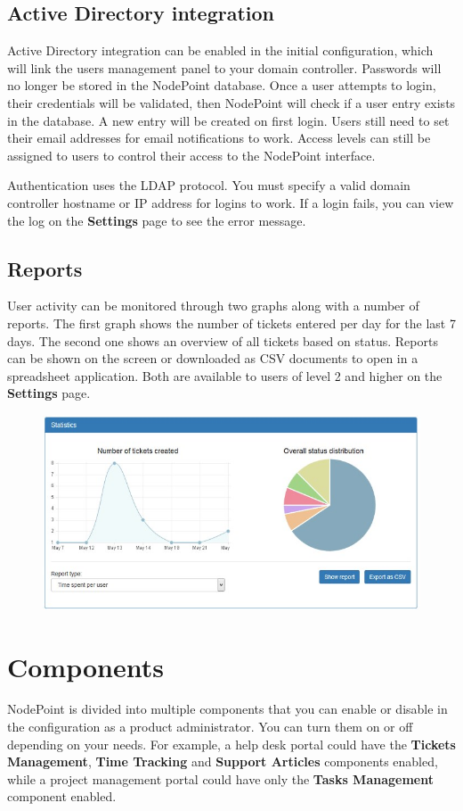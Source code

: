 \documentclass[11pt]{article}
\begin{document}
\subsection{Active Directory integration}
Active Directory integration can be enabled in the initial configuration, which will link the users management panel to your domain controller. Passwords will no longer be stored in the NodePoint database. Once a user attempts to login, their credentials will be validated, then NodePoint will check if a user entry exists in the database. A new entry will be created on first login. Users still need to set their email addresses for email notifications to work. Access levels can still be assigned to users to control their access to the NodePoint interface.

Authentication uses the LDAP protocol. You must specify a valid domain controller hostname or IP address for logins to work. If a login fails, you can view the log on the \textbf{Settings} page to see the error message.

\subsection{Reports}
User activity can be monitored through two graphs along with a number of reports. The first graph shows the number of tickets entered per day for the last 7 days. The second one shows an overview of all tickets based on status. Reports can be shown on the screen or downloaded as CSV documents to open in a spreadsheet application. Both are available to users of level 2 and higher on the \textbf{Settings} page.

\begin{figure}[h]
\includegraphics{reports.jpg}
\end{figure}

\clearpage
\section{Components}
NodePoint is divided into multiple components that you can enable or disable in the configuration as a product administrator. You can turn them on or off depending on your needs. For example, a help desk portal could have the \textbf{Tickets Management}, \textbf{Time Tracking} and \textbf{Support Articles} components enabled, while a project management portal could have only the \textbf{Tasks Management} component enabled.
\end{document}
